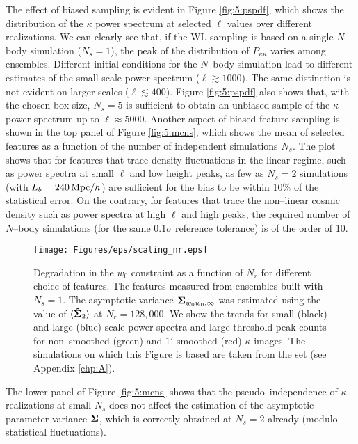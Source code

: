 %
The effect of biased sampling is evident in Figure \ref{fig:5:pspdf}, which shows the distribution of the $\kappa$ power spectrum at selected $\ell$ values over different realizations. We can clearly see that, if the WL sampling is based on a single $N$--body simulation ($N_s=1$), the peak of the distribution of $P_{\kappa\kappa}$ varies among ensembles. Different initial conditions  for the $N$--body simulation lead to different estimates of the small scale power spectrum ($\ell\gtrsim 1000$). The same distinction is not evident on larger scales ($\ell\lesssim 400$). Figure \ref{fig:5:pspdf} also shows that, with the chosen box size, $N_s=5$ is sufficient to obtain an unbiased sample of the $\kappa$ power spectrum up to $\ell\approx5000$. Another aspect of biased feature sampling is shown in the top panel of Figure \ref{fig:5:mcns}, which shows the mean of selected features as a function of the number of independent simulations $N_s$. The plot shows that for features that trace density fluctuations in the linear regime, such as power spectra at small $\ell$ and low height peaks, as few as $N_s=2$ simulations (with $L_b=240\,{\rm Mpc}/h$) are sufficient for the bias to be within 10\% of the statistical error. On the contrary, for features that trace the non--linear cosmic density such as power spectra at high $\ell$ and high peaks, the required number of $N$--body simulations (for the same $0.1\sigma$ reference tolerance) is of the order of 10.    
%
\begin{figure}
\begin{center}
\texttt{[image: Figures/eps/scaling\_nr.eps]}
\end{center}
\caption{Degradation in the $w_0$ constraint as a function of $N_r$ for different choice of features. The features measured from ensembles built with $N_s=1$. The asymptotic variance $\mathbf{\Sigma}_{w_0w_0,\infty}$ was estimated using the value of $\langle\mathbf{\hat{\Sigma}}_2\rangle$ at $N_r=128,000$. We show the trends for small (black) and large (blue) scale power spectra and large threshold peak counts for non--smoothed (green) and $1'$ smoothed (red) $\kappa$ images. The simulations on which this Figure is based are taken from the  set (see Appendix \ref{chp:A}).}
\label{fig:5:pseudonr}
\end{figure}
%
The lower panel of Figure \ref{fig:5:mcns} shows that the pseudo--independence of $\kappa$ realizations at small $N_s$ does not affect the estimation of the asymptotic parameter variance $\mathbf{\Sigma}$, which is correctly obtained at $N_s=2$ already (modulo statistical fluctuations). 

